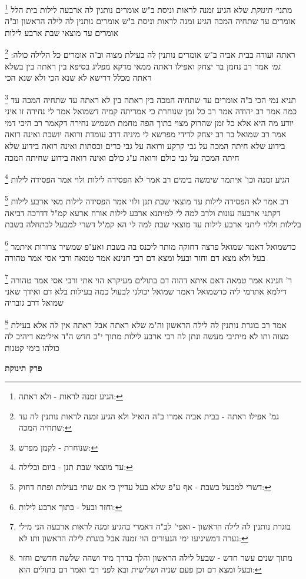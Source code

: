 \documentclass[12pt, openany]{book}
\newcommand{\sethebfont}{
\fontsize{10.5pt}{21.0pt} \selectfont
}
\newcommand{\twocol}[1]{
	{\sethebfont \begin{multicols}{2}
			#1
	\end{multicols}}	
}
\newcommand{\chapname}{}
\newcommand{\newchap}[1]{
	\addcontentsline{toc}{chapter}{#1}
	\renewcommand{\chapname}{#1}
		\begin{center}
			\textbf{%
\fontsize{16pt}{16pt}\selectfont
				#1}
		\end{center}
}
\newcommand{\footnotecomment}[1]{
	\renewcommand\thefootnote{}
	\footnote{#1}}
\newcommand{\commenta}[1]{\footnotecomment{#1}}
\begin{document}
{\commenta{הגיע זמנה לראות - ולא ראתה:}
מתני׳ {\large\emph{תינוקת}} שלא הגיע זמנה לראות וניסת ב"ש אומרים נותנין לה ארבעה לילות בית הלל אומרים עד שתחיה המכה
הגיע זמנה לראות וניסת ב"ש אומרים נותנין לה לילה הראשון וב"ה אומרים עד מוצאי שבת ארבע לילות
\commenta{גמ' אפילו ראתה - בבית אביה אמרו ב"ה הואיל ולא הגיע זמנה לראות נותנין לה עד שתחיה המכה:}
ראתה ועודה בבית אביה ב"ש אומרים נותנין לה בעילת מצוה וב"ה אומרים כל הלילה כולה:
{\large\emph{גמ׳}} אמר רב נחמן בר יצחק ואפילו ראתה ממאי מדקא מפליג בסיפא בין ראתה בין בשלא ראתה מכלל דרישא לא שנא הכי ולא שנא הכי 
\commenta{שנוחרת - לקמן מפרש:}
תניא נמי הכי ב"ה אומרים עד שתחיה המכה בין ראתה בין לא ראתה
עד שתחיה המכה עד כמה אמר רב יהודה אמר רב כל זמן שנוחרת כי אמריתה קמיה דשמואל אמר לי נחירה זו איני יודע מה היא אלא כל זמן שהרוק מצוי בתוך הפה מחמת תשמיש 
נחירה דקאמר רב היכי דמי אמר רב שמואל בר רב יצחק לדידי מפרשא לי מיניה דרב עומדת ורואה יושבת ואינה רואה בידוע שלא חיתה המכה על גבי קרקע ורואה על גבי כרים וכסתות ואינה רואה בידוע שלא חיתה המכה על גבי כולם ורואה ע"ג כולם ואינה רואה בידוע שחיתה המכה
\commenta{עד מוצאי שבת תנן - ביום ובלילה:}
הגיע זמנה וכו' איתמר שימשה בימים רב אמר לא הפסידה לילות ולוי אמר הפסידה לילות 
\commenta{דשרי למבעל בשבת - אף ע"פ שלא בעל עדיין כי אם שתי בעילות ופתח דחוק:}
רב אמר לא הפסידה לילות עד מוצאי שבת תנן ולוי אמר הפסידה לילות מאי ארבע לילות דקתני ארבעה עונות 
ולרב למה לי למיתנא ארבע לילות אורח ארעא קמ"ל דדרכה דביאה בלילות וללוי ליתני ארבע לילות עד מוצאי שבת למה לי הא קמ"ל דשרי למבעל לכתחלה בשבת 
\commenta{וחזר ובעל - בתוך ארבע לילות:}
כדשמואל דאמר שמואל פרצה דחוקה מותר ליכנס בה בשבת ואע"פ שמשיר צרורות 
איתמר בעל ולא מצא דם וחזר ובעל ומצא דם רבי חנינא אמר טמאה ורבי אסי אמר טהורה 
\commenta{בוגרת נותנין לה לילה הראשון - ואפי' לב"ה דאמרי בהגיע זמנה לראות ארבעה הני מילי נערה דמשיגיעו ימי הנעורים הוי זמנה אבל בוגרת לילה הראשון ותו לא:}
ר' חנינא אמר טמאה דאם איתא דהוה דם בתולים מעיקרא הוי אתי ורבי אסי אמר טהורה דילמא אתרמי ליה כדשמואל דאמר שמואל יכולני לבעול כמה בעילות בלא דם ואידך שאני שמואל דרב גובריה 
\commenta{מתוך שנים עשר חדש - שבעל לילה הראשון והלך בדרך מיד ושהה שלשה חדשים וחזר ובעל ומצא דם וכן פעם שניה ושלישית ובא לפני רבי ואמר דם בתולים הוא:}
אמר רב בוגרת נותנין לה לילה הראשון וה"מ שלא ראתה אבל ראתה אין לה אלא בעילת מצוה ותו לא 
מיתיבי מעשה ונתן לה רבי ארבע לילות מתוך י"ב חדש ה"ד אילימא דיהיב לה כולהו בימי קטנות}

\newchap{פרק  תינוקת}
\twocol{\clearpage}
\end{document}
